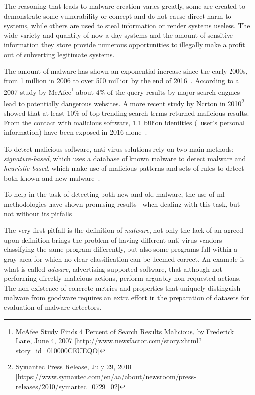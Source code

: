 The reasoning that leads to malware creation varies greatly, some are created to demonstrate some vulnerability or concept and do not cause direct harm to systems, while others are used to steal information or render systems useless.
The wide variety and quantity of now-a-day systems and the amount of sensitive information they store provide numerous opportunities to illegally make a profit out of subverting legitimate systems.

The amount of malware has shown an exponential increase since the early 2000s, from 1 million in 2006 to over 500 million by the end of 2016~\cite{av-test:report,mcafee:report}. According to a 2007 study by McAfee\footnote{McAfee Study Finds 4 Percent of Search Results Malicious, by Frederick Lane, June 4, 2007 [http://www.newsfactor.com/story.xhtml?story\_id=010000CEUEQO]} about 4\% of the query results by major search engines lead to potentially dangerous websites. A more recent study by Norton in 2010\footnote{Symantec Press Release, July 29, 2010 [https://www.symantec.com/en/aa/about/newsroom/press-releases/2010/symantec\_0729\_02]} showed that at least 10\% of top trending search terms returned malicious results. From the contact with malicious software, 1.1 billion identities (\ie\ user's personal information) have been exposed in 2016 alone~\cite{symantec:report}.

To detect malicious software, anti-virus solutions rely on two main methods: \textit{signature-based}, which uses a database of known malware to detect malware and \textit{heuristic-based}, which make use of malicious patterns and sets of rules to detect both known and new malware~\cite{gryaznov:scanners}.

To help in the task of detecting both new and old malware, the use of \gls{ml} methodologies have shown promising results~\cite{arp2014drebin,christodorescu:semantics,kolosnjaji2016deep,kolter:learning,miller:rev_int,nissim:al_pdf,perdisci:behavior,rieck:dynamic,santos2013opcode,schultz:data_mining,schwenk2012autonomous,vsrndic2013detection} when dealing with this task, but not without its pitfalls~\cite{deo2016prescience,gandotra2014malware,jordaney2017transcend,rossow:practices}.

The very first pitfall is the definition of \textit{malware}, not only the lack of an agreed upon definition brings the problem of having different anti-virus vendors classifying the same program differently, but also some programs fall within a gray area for which no clear classification can be deemed correct.
An example is what is called \textit{adware}, advertising-supported software, that although not performing directly malicious actions, perform arguably non-requested actions.
The non-existence of concrete metrics and properties that uniquely distinguish malware from goodware requires an extra effort in the preparation of datasets for evaluation of malware detectors.

